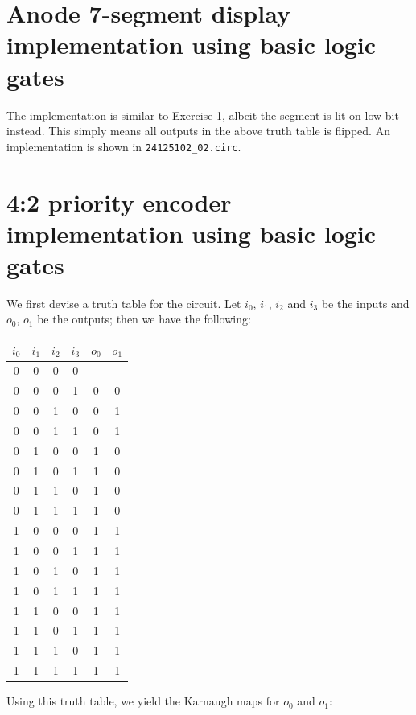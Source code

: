 \documentclass{exam}
\begin{document}
\section{Anode 7-segment display implementation using basic logic gates}
The implementation is similar to Exercise 1, albeit the segment is lit on low bit instead. This simply means all outputs in the above truth table is flipped. An implementation is shown in \verb|24125102_02.circ|.

\section{4:2 priority encoder implementation using basic logic gates}
We first devise a truth table for the circuit. Let $i_0$, $i_1$, $i_2$ and $i_3$ be the inputs and $o_0$, $o_1$ be the outputs; then we have the following:
\begin{center}
	\bgroup
	\def\arraystretch{1.2}
	\begin{tabular}{|cccc|cc|}
		\hline
		$i_0$ & $i_1$ & $i_2$ & $i_3$ & $o_0$ & $o_1$ \\
		\hline
		0 & 0 & 0 & 0 & - & - \\
		0 & 0 & 0 & 1 & 0 & 0 \\
		0 & 0 & 1 & 0 & 0 & 1 \\
		0 & 0 & 1 & 1 & 0 & 1 \\
		0 & 1 & 0 & 0 & 1 & 0 \\
		0 & 1 & 0 & 1 & 1 & 0 \\
		0 & 1 & 1 & 0 & 1 & 0 \\
		0 & 1 & 1 & 1 & 1 & 0 \\
		1 & 0 & 0 & 0 & 1 & 1 \\
		1 & 0 & 0 & 1 & 1 & 1 \\
		1 & 0 & 1 & 0 & 1 & 1 \\
		1 & 0 & 1 & 1 & 1 & 1 \\
		1 & 1 & 0 & 0 & 1 & 1 \\
		1 & 1 & 0 & 1 & 1 & 1 \\
		1 & 1 & 1 & 0 & 1 & 1 \\
		1 & 1 & 1 & 1 & 1 & 1 \\
		\hline
	\end{tabular}
	\egroup
\end{center}
Using this truth table, we yield the Karnaugh maps for $o_0$ and $o_1$:
\end{document}
